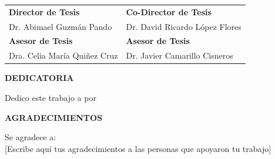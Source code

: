 \documentclass[12pt,letterpaper,oneside]{report}
\begin{document}
\begin{center}
\begin{tabular}{@{}p{6.5cm}p{6.5cm}@{}}
\rule{0pt}{10pt}\textbf{Director de Tesis} & \textbf{Co-Director de Tesis}\\[0.3cm]

Dr. Abimael Guzm\'an Pando & Dr. David Ricardo L\'opez Flores\\[0.8cm]

\textbf{Asesor de Tesis} & \textbf{Asesor de Tesis}\\[0.3cm]

Dra. Celia Mar\'ia Qui\~nez Cruz & Dr. Javier Camarillo Cisneros\\[0.3cm]
\end{tabular}
\end{center}

\newpage
\thispagestyle{empty}

\begin{center}
{\fontsize{14}{16}\selectfont\bfseries DEDICATORIA}\\[1.5cm]
\end{center}

\begin{flushleft}
{\fontsize{12}{14}\selectfont 

Dedico este trabajo a \underline{\hspace{3cm}} por \underline{\hspace{3cm}}\\[2cm]

}
\end{flushleft}

\begin{center}
{\fontsize{14}{16}\selectfont\bfseries AGRADECIMIENTOS}\\[1.5cm]
\end{center}

\begin{flushleft}
{\fontsize{12}{14}\selectfont 

Se agradece a:\\[0.5cm]

[Escribe aquí tus agradecimientos a las personas que apoyaron tu trabajo]

}
\end{flushleft}

\clearpage  %
\end{document}
